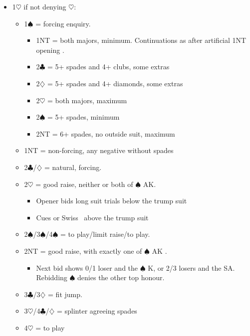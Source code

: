 \documentclass[a4paper,14pt]{extarticle}
\begin{document}
\begin{itemize}
\item 1$\heartsuit$ if not denying $\heartsuit$:
	\begin{itemize}
   \item 1$\spadesuit$ = forcing enquiry.
		\begin{itemize}
      \item 1NT = both majors, minimum. Continuations as after artificial 1NT opening .
      \item 2$\clubsuit$ = 5+ spades and 4+ clubs, some extras
      \item 2$\diamondsuit$ = 5+ spades and 4+ diamonds, some extras
      \item 2$\heartsuit$ = both majors, maximum
		\item 2$\spadesuit$ = 5+ spades, minimum
		\item 2NT = 6+ spades, no outside suit, maximum
		\end{itemize}
   \item 1NT = non-forcing, any negative without spades
   \item 2$\clubsuit$/$\diamondsuit$ = natural, forcing.
   \item 2$\heartsuit$ = good raise, neither or both of $\spadesuit$ AK.
		\begin{itemize}
		\item Opener bids long suit trials below the trump suit
		\item Cues or Swiss~ above the trump suit
		\end{itemize}
   \item 2$\spadesuit$/3$\spadesuit$/4$\spadesuit$ = to play/limit raise/to play.
\label{note:1}
   \item 2NT = good raise, with exactly one of $\spadesuit$ AK .
		\begin{itemize}
      \item Next bid shows 0/1 loser and the $\spadesuit$ K, or 2/3 losers and the SA.
         Rebidding $\spadesuit$ denies the other top honour.
		\end{itemize}
\label{note:2}
   \item 3$\clubsuit$/3$\diamondsuit$ = fit jump.
\label{note:6}
   \item 3$\heartsuit$/4$\clubsuit$/$\diamondsuit$ = splinter agreeing spades
	\item 4$\heartsuit$ = to play
	\end{itemize}

\newpage


\end{itemize}
\end{document}

